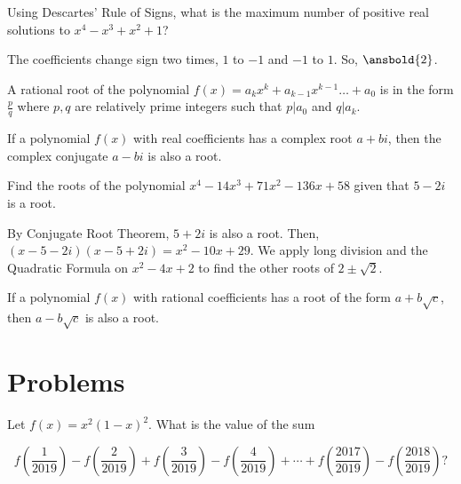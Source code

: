 \documentclass[mast]{lucky}
\begin{document}
\begin{exam}
Using Descartes' Rule of Signs, what is the maximum number of positive real solutions to $x^4-x^3+x^2+1$?
\end{exam}

\begin{sol}
The coefficients change sign two times, $1$ to $-1$ and $-1$ to $1$. So, $\ansbold{2}$.
\end{sol}

\begin{theo}
A rational root of the polynomial $f(x)=a_{k}x^{k}+a_{k-1}x^{k-1}\ldots + a_{0}$ is in the form $\frac{p}{q}$ where $p,q$ are relatively prime integers such that $p|a_{0}$ and $q|a_{k}$.
\end{theo}

\begin{theo}
If a polynomial $f(x)$ with real coefficients has a complex root $a+bi$, then the complex conjugate $a-bi$ is also a root.
\end{theo}

\begin{exam}
Find the roots of the polynomial $x^4-14x^3+71x^2-136x+58$ given that $5-2i$ is a root.
\end{exam}

\begin{sol}
By Conjugate Root Theorem, $5+2i$ is also a root. Then, $(x-5-2i)(x-5+2i)=x^2-10x+29$. We apply long division and the Quadratic Formula on $x^2-4x+2$ to find the other roots of $2\pm \sqrt{2}$.
\end{sol}


\begin{theo}
If a polynomial $f(x)$ with rational coefficients has a root of the form $a+b\sqrt{c}$, then $a-b\sqrt{c}$ is also a root.
\end{theo}

\newpage
\section{Problems}



\begin{prob}[AMC 12B 2019/8]{1}

Let $f(x) = x^{2}(1-x)^{2}$. What is the value of the sum

\[f \left(\frac{1}{2019} \right)-f  \left(\frac{2}{2019} \right)+f \left(\frac{3}{2019} \right)-f \left(\frac{4}{2019} \right)+\cdots + f \left(\frac{2017}{2019} \right) - f \left(\frac{2018}{2019} \right)?\]
\end{prob}
\end{document}

